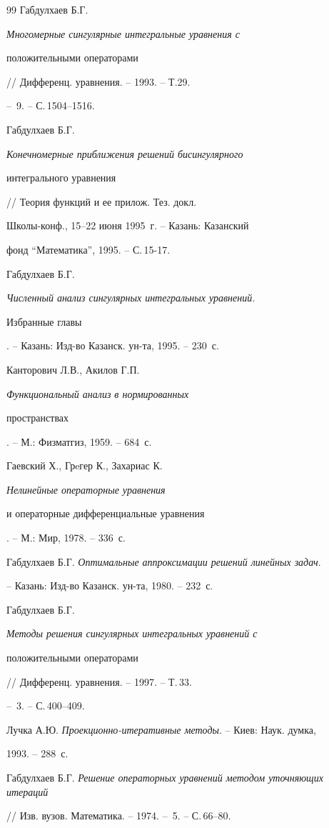 \begin{thebibliography}{99}
Габдулхаев Б.Г. {\em Многомерные сингулярные интегральные уравнения с 


положительными операторами} // Дифференц. уравнения. -- 1993. -- Т.29.


-- \No\,9. -- С.\,1504--1516.




Габдулхаев Б.Г. {\em Конечномерные приближения решений бисингулярного 


интегрального уравнения} // Теория функций и ее прилож. Тез. докл. 


Школы-конф., 15--22 июня 1995~г. -- Казань: Казанский 


фонд ``Математика'', 1995. -- С.\,15-17.




Габдулхаев Б.Г. {\em Численный анализ сингулярных интегральных уравнений. 


Избранные главы}. -- Казань: Изд-во Казанск. ун-та, 1995. -- 230~с.




Канторович Л.В.,  Акилов Г.П. {\em Функциональный анализ в нормированных 


пространствах}. -- М.: Физматгиз, 1959. -- 684~с.




Гаевский Х., Грeгер К., Захариас К. {\em Нелинейные операторные уравнения 


и операторные дифференциальные уравнения}. -- М.: Мир, 1978. -- 336~с.




Габдулхаев Б.Г. {\em Оптимальные аппроксимации решений линейных задач}.


-- Казань: Изд-во Казанск. ун-та, 1980. -- 232~с.




Габдулхаев Б.Г. {\em Методы решения сингулярных интегральных уравнений с 


положительными операторами} // Дифференц. уравнения. -- 1997. -- Т.\,33.


-- \No\,3. -- С.\,400--409.




Лучка А.Ю. {\em Проекционно-итеративные методы}. -- Киев: Наук. думка,


1993. -- 288~с.




Габдулхаев Б.Г. {\em Решение операторных уравнений методом уточняющих итераций}


// Изв. вузов. Математика. -- 1974. -- \No\,5. -- С.\,66--80.





\end{thebibliography}





\vskip 2cm












\label{end}









